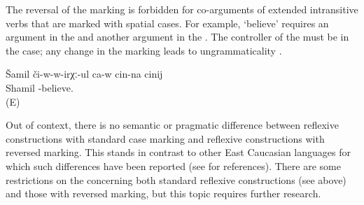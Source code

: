 The reversal of the marking is forbidden for co-arguments of extended intransitive verbs that are marked with spatial cases. For example, ‘believe' requires an argument in the  and another argument in the . The controller of the  must be in the  case; any change in the marking leads to ungrammaticality . 

\begin{exe}
	\ex	\label{ex:Rasul is believing in himself@13}
	\begin{xlist}
		\ex	\label{ex:Rasul is believing in himself@13A}
		\gll	Šamil	či-w-w-irχː-ul ca-w	cin-na	cinij\\
			Shamil	-believe.  	\\
		\glt	{} (E)

	\end{xlist}
\end{exe}


Out of context, there is no semantic or pragmatic difference between reflexive constructions with standard case marking and reflexive constructions with reversed marking. This stands in contrast to other East Caucasian languages for which such differences have been reported (see \citealp{Forker2014} for references). There are some restrictions on the  concerning both standard reflexive constructions (see above) and those with reversed marking, but this topic requires further research.
%

